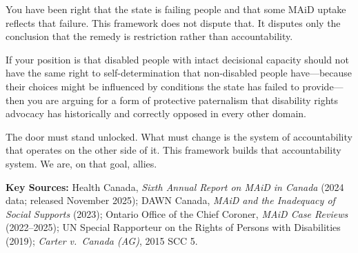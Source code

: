 \documentclass[11pt, letterpaper]{article}
\begin{document}
\begin{policybox}[title={\sffamily\bfseries\small\color{C@accent}
  A Direct Statement to Disability Rights Organizations}]
You have been right that the state is failing people and that some MAiD uptake reflects
that failure. This framework does not dispute that. It disputes only the conclusion that
the remedy is restriction rather than accountability.

If your position is that disabled people with intact decisional capacity should not have
the same right to self-determination that non-disabled people have---because their choices
might be influenced by conditions the state has failed to provide---then you are arguing
for a form of protective paternalism that disability rights advocacy has historically and
correctly opposed in every other domain.

The door must stand unlocked. What must change is the system of accountability that operates
on the other side of it. This framework builds that accountability system. We are, on that
goal, allies.
\end{policybox}

\bigskip

{\small\sffamily\color{C@midgray}
\textbf{Key Sources:}
Health Canada, \textit{Sixth Annual Report on MAiD in Canada} (2024 data; released November 2025);
DAWN Canada, \textit{MAiD and the Inadequacy of Social Supports} (2023);
Ontario Office of the Chief Coroner, \textit{MAiD Case Reviews} (2022--2025);
UN Special Rapporteur on the Rights of Persons with Disabilities (2019);
\textit{Carter v.\ Canada (AG)}, 2015 SCC 5.}
\end{document}
